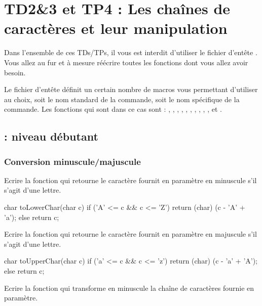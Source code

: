 \chapter{TD2\&3 et TP4 : Les chaînes de caractères et leur
manipulation}

Dans l'ensemble de ces TDs/TPs, il vous est interdit d'utiliser le fichier
d'entête . Vous allez au fur et à mesure réécrire toutes
les fonctions dont vous allez avoir besoin.

Le fichier d'entête  définit un certain nombre de
macros vous permettant d'utiliser au choix, soit le nom standard de la commande,
soit le nom spécifique de la commande. Les fonctions qui sont dans ce cas sont :
, , , , , , , , ,
,  et .

\section{ : niveau débutant}

\subsection{Conversion minuscule/majuscule}

Ecrire la fonction  qui retourne le
caractère fournit en paramètre en minuscule s'il s'agit d'une lettre.

\begin{csourcecorrection}
char toLowerChar(char c) {
    if ('A' <= c && c <= 'Z')
        return (char) (c - 'A' + 'a');
    else
        return c;
}
\end{csourcecorrection}
  
Ecrire la fonction  qui retourne le
caractère fournit en paramètre en majuscule s'il s'agit d'une lettre.

\begin{csourcecorrection}
char toUpperChar(char c) {
    if ('a' <= c && c <= 'z')
        return (char) (c - 'a' + 'A');
    else
        return c;
}
\end{csourcecorrection}

Ecrire la fonction  qui transforme en minuscule la chaîne de caractères fournie en paramètre.

